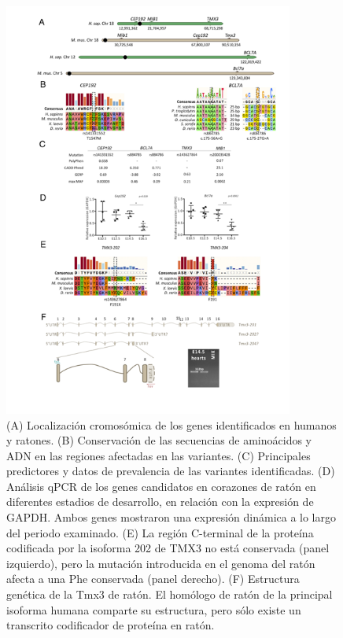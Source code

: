 \begin{figure}[htbp]
\centering
\includegraphics[width = 0.85\textwidth]{figs/Imagen1-paper.png}
\caption{(A) Localización cromosómica de los genes identificados en humanos y ratones. (B) Conservación de las secuencias de aminoácidos y ADN en las regiones afectadas en las variantes. (C) Principales predictores y datos de prevalencia de las variantes identificadas. (D) Análisis qPCR de los genes candidatos en corazones de ratón en diferentes estadios de desarrollo, en relación con la expresión de GAPDH. Ambos genes mostraron una expresión dinámica a lo largo del periodo examinado.  (E) La región C-terminal de la proteína codificada por la isoforma 202 de TMX3 no está conservada (panel izquierdo), pero la mutación introducida en el genoma del ratón afecta a una Phe conservada (panel derecho). (F) Estructura genética de la Tmx3 de ratón. El homólogo de ratón de la principal isoforma humana comparte su estructura, pero sólo existe un transcrito codificador de proteína en ratón. }
\end{figure}